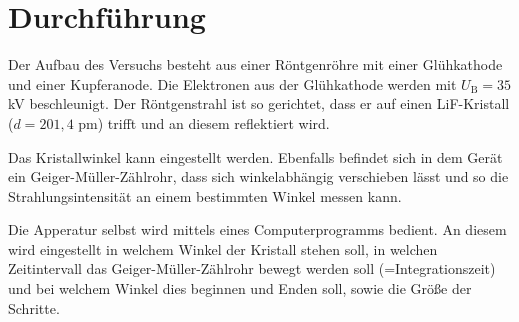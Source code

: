 \section{Durchführung}
\label{sec:Durchführung}

Der Aufbau des Versuchs besteht aus einer Röntgenröhre mit einer Glühkathode und einer Kupferanode.
Die Elektronen aus der Glühkathode werden mit $U_\text{B} = 35$ kV beschleunigt. Der Röntgenstrahl ist so gerichtet, dass er auf einen LiF-Kristall ($d = 201,4$ pm) trifft und an diesem reflektiert wird.

Das Kristallwinkel kann eingestellt werden.
Ebenfalls befindet sich in dem Gerät ein Geiger-Müller-Zählrohr, dass sich winkelabhängig verschieben lässt und so die Strahlungsintensität an einem bestimmten Winkel messen kann.

Die Apperatur selbst wird mittels eines Computerprogramms bedient.
An diesem wird eingestellt in welchem Winkel der Kristall stehen soll, in welchen Zeitintervall das Geiger-Müller-Zählrohr bewegt werden soll (=Integrationszeit) und bei welchem Winkel dies beginnen und Enden soll, sowie die Größe der Schritte.

